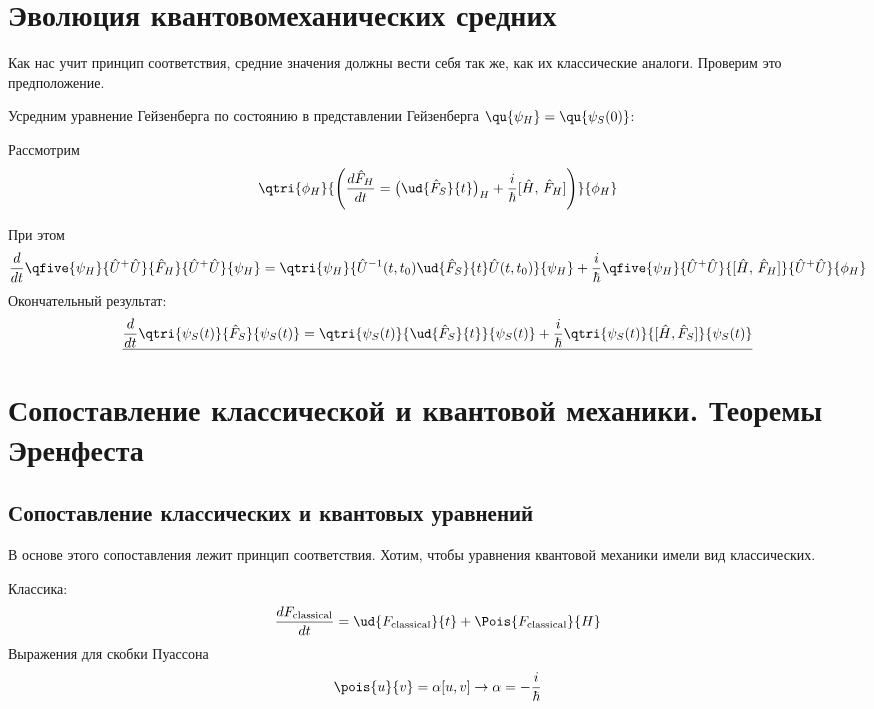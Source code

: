 \section{Эволюция квантовомеханических средних}
Как нас учит принцип соответствия, средние значения должны вести себя так же, как их классические аналоги. Проверим это предположение.

Усредним уравнение Гейзенберга по состоянию в представлении Гейзенберга $\qu{\psi_H} = \qu{\psi_S(0)}$:

Рассмотрим
$$
    \qtri{\phi_H}{ \left( \dfrac{d \Hat F_H}{d t} = \big( \ud{\Hat F_S}{t} \big)_H + \dfrac{i}{\hbar} [\Hat H, \, \Hat F_H] \right)}{\phi_H}
$$

При этом
$$
\dfrac{d}{dt} \qfive{\psi_H}{\Hat U^+ \Hat U}{\Hat F_H}{\Hat U^+ \Hat U}{\psi_H}
= \qtri
    {\psi_H}
    {\Hat U^{-1} (t,t_0) \ud{\Hat F_S}{t} \Hat U(t, t_0)}
    {\psi_H}
    +
\dfrac{i}{\hbar}
\qfive{\psi_H}{\Hat U^+ \Hat U} { [\Hat H, \, \Hat F_H] } {\Hat U^+ \Hat U} {\phi_H}
$$
Окончательный результат:
$$
\underline{    \dfrac{d}{dt} \qtri{\psi_S(t)}{\Hat F_S}{\psi_S(t)}
    = \qtri{\psi_S(t)}{ \ud{\Hat F_S}{t}}{\psi_S(t)}
    + \dfrac{i}{\hbar} \qtri{\psi_S(t)}{[\Hat H, \Hat F_S]}{\psi_S(t)}
}$$

\section{Сопоставление классической и квантовой механики. Теоремы Эренфеста}

\subsection{Сопоставление классических и квантовых уравнений}
В основе этого сопоставления лежит принцип соответствия. Хотим, чтобы уравнения квантовой механики имели вид классических.

Классика:
$$
    \dfrac{d F_{\text{classical}}}{dt} = \ud{F_{\text{classical}}}{t} + \Pois{F_{\text{classical}}}{H}
$$
Выражения для скобки Пуассона
$$
    \pois{u}{v} = \alpha [u, v] \to \alpha = -\dfrac{i}{\hbar}
$$


